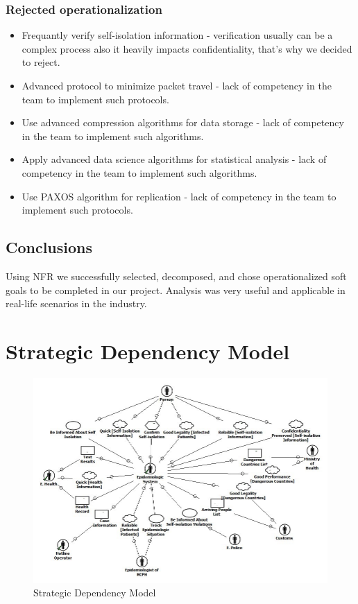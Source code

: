 \documentclass{VUMIFPSkursinis}
\begin{document}
	\subsubsection{Rejected operationalization}
		\begin{itemize}
			\item{Frequantly verify self-isolation information - verification usually can be a complex process also it heavily impacts confidentiality, that's why we decided to reject.}
			\item{Advanced protocol to minimize packet travel - lack of competency in the team to implement such protocols.}
			\item{Use advanced compression algorithms for data storage - lack of competency in the team to implement such algorithms.}
			\item{Apply advanced data science algorithms for statistical analysis - lack of competency in the team to implement such algorithms.}
			\item{Use PAXOS algorithm for replication - lack of competency in the team to implement such protocols.}
		\end{itemize}
\subsection{Conclusions}
 Using NFR we successfully selected, decomposed, and chose operationalized soft goals to be completed in our project.
Analysis was very useful and applicable in real-life scenarios in the industry.
\section{Strategic Dependency Model}
\begin{figure}[H]
    \center
    \includegraphics[scale=0.5]{StarUML/Strategic_Dependency.jpg}
    \caption{Strategic Dependency Model} %
    \label{img:strategicDep}
\end{figure}
\end{document}
